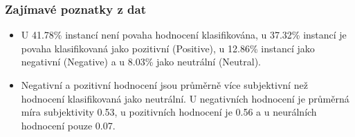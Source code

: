 \documentclass{article}
\begin{document}
\clearpage

\subsubsection*{Zajímavé poznatky z dat}
\begin{itemize}
    \item U 41.78\% instancí není povaha hodnocení klasifikována, u 37.32\% instancí je povaha klasifikovaná jako pozitivní (Positive), u 12.86\% instancí jako negativní (Negative) a u 8.03\% jako neutrální (Neutral).
        
    \item Negativní a pozitivní hodnocení jsou průměrně více subjektivní než hodnocení klasifikovaná jako neutrální. U negativních hodnocení je průměrná míra subjektivity 0.53, u pozitivních hodnocení je 0.56 a u neurálních hodnocení pouze 0.07.

\end{itemize}

\vspace{50pt}

\begin{minipage}{\linewidth}
            \centering
{}
\\
            \caption{Rozložení klasifikace povahy v datasetu}
        \end{minipage}
\begin{figure}
\centering
\end{figure}


\clearpage

\printbibliography
\end{document}

